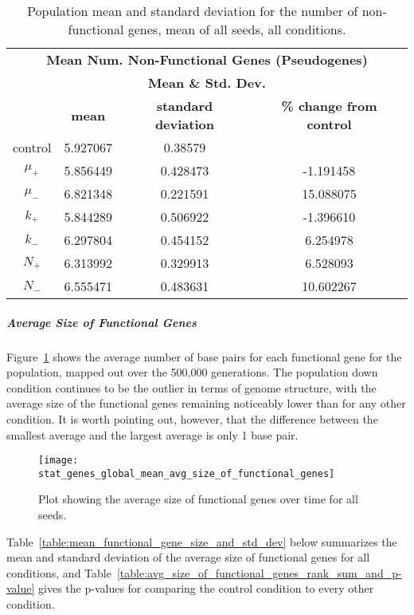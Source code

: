 \begin{table}[H]
	\centering
	\begin{tabular}{|c|c|c|c|}
		\hline
		\multicolumn{4}{c}{\Large \textbf{Mean Num. Non-Functional Genes (Pseudogenes)}} \\
		\multicolumn{4}{c}{\Large \textbf{Mean \& Std. Dev.}} \\
		\hline
		& \textbf{mean} & \textbf{standard deviation} & \textbf{\% change from control} \\
		\hline
		control & 5.927067 & 0.38579 & \textemdash \\ 
		\hline
		$\mu_+$ & 5.856449 & 0.428473 & -1.191458 \\ 
		\hline
		$\mu_-$ & 6.821348 & 0.221591 & 15.088075 \\ 
		\hline
		$k_+$ & 5.844289 & 0.506922 & -1.396610 \\ 
		\hline
		$k_-$ & 6.297804 & 0.454152 & 6.254978 \\ 
		\hline
		$N_+$ & 6.313992 & 0.329913 & 6.528093 \\ 
		\hline
		$N_-$ & 6.555471 & 0.483631 & 10.602267 \\ 
		\hline
	\end{tabular}
	\caption[Number of Non-functional Genes - Mean \& St. Dev.]{Population mean and standard deviation for the number of non-functional genes, mean of all seeds, all conditions.}
	\label{table:non-functional_genes_mean_std_dev}
\end{table}

\subparagraph{Average Size of Functional Genes}\label{sec:average_size_functional_genes}
Figure~\ref{fig:mean_functional_gene_size} shows the average number of base pairs for each functional gene for the population, mapped out over the 500,000 generations. The population down condition continues to be the outlier in terms of genome structure, with the average size of the functional genes remaining noticeably lower than for any other condition. It is worth pointing out, however, that the difference between the smallest average and the largest average is only 1 base pair. 
\begin{figure}[H]
	\centering
	\texttt{[image: stat\_genes\_global\_mean\_avg\_size\_of\_functional\_genes]}
	\caption[Average size of functional genes]{Plot showing the average size of functional genes over time for all seeds.}
	\label{fig:mean_functional_gene_size}
\end{figure}
Table~\ref{table:mean_functional_gene_size_and_std_dev} below summarizes the mean and standard deviation of the average size of functional genes for all conditions, and Table~\ref{table:avg_size_of_functional_genes_rank_sum_and_p-value} gives the p-values for comparing the control condition to every other condition. 

